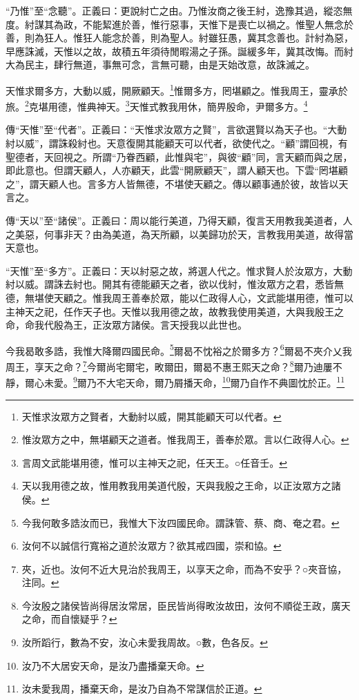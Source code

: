 {\noindent\shu{}\fzkt “乃惟”至“念聽”。正義曰：更說紂亡之由。乃惟汝商之後王紂，逸豫其過，縱恣無度。紂謀其為政，不能絜進於善，惟行惡事，天惟下是喪亡以禍之。惟聖人無念於善，則為狂人。惟狂人能念於善，則為聖人。紂雖狂愚，冀其念善也。計紂為惡，早應誅滅，天惟以之故，故積五年須待閒暇湯之子孫。誕緩多年，冀其改悔。而紂大為民主，肆行無道，事無可念，言無可聽，由是天始改意，故誅滅之。 \par}

天惟求爾多方，大動以威，開厥顧天。\footnote{天惟求汝眾方之賢者，大動紂以威，開其能顧天可以代者。}惟爾多方，罔堪顧之。惟我周王，靈承於旅。\footnote{惟汝眾方之中，無堪顧天之道者。惟我周王，善奉於眾。言以仁政得人心。}克堪用德，惟典神天。\footnote{言周文武能堪用德，惟可以主神天之祀，任天王。○任音壬。}天惟式教我用休，簡畀殷命，尹爾多方。\footnote{天以我用德之故，惟用教我用美道代殷，天與我殷之王命，以正汝眾方之諸侯。}


{\noindent\zhuan{}\fzbyks 傳“天惟”至“代者”。正義曰：“天惟求汝眾方之賢”，言欲選賢以為天子也。“大動紂以威”，謂誅殺紂也。天意復開其能顧天可以代者，欲使代之。“顧”謂回視，有聖德者，天回視之。所謂“乃眷西顧，此惟與宅”，與彼“顧”同，言天顧而與之居，即此意也。但謂天顧人，人亦顧天，此雲“開厥顧天”，謂人顧天也。下雲“罔堪顧之”，謂天顧人也。言多方人皆無德，不堪使天顧之。傳以顧事通於彼，故皆以天言之。 \par}

{\noindent\zhuan{}\fzbyks 傳“天以”至“諸侯”。正義曰：周以能行美道，乃得天顧，復言天用教我美道者，人之美惡，何事非天？由為美道，為天所顧，以美歸功於天，言教我用美道，故得當天意也。 \par}

{\noindent\shu{}\fzkt “天惟”至“多方”。正義曰：天以紂惡之故，將選人代之。惟求賢人於汝眾方，大動紂以威。謂誅去紂也。開其有德能顧天之者，欲以伐紂，惟汝眾方之君，悉皆無德，無堪使天顧之。惟我周王善奉於眾，能以仁政得人心，文武能堪用德，惟可以主神天之祀，任作天子也。天惟以我用德之故，故教我使用美道，大與我殷王之命，命我代殷為王，正汝眾方諸侯。言天授我以此世也。 \par}

今我曷敢多誥，我惟大降爾四國民命。\footnote{今我何敢多誥汝而已，我惟大下汝四國民命。謂誅管、蔡、商、奄之君。}爾曷不忱裕之於爾多方？\footnote{汝何不以誠信行寬裕之道於汝眾方？欲其戒四國，崇和協。}爾曷不夾介乂我周王，享天之命？\footnote{夾，近也。汝何不近大見治於我周王，以享天之命，而為不安乎？○夾音協，注同。}今爾尚宅爾宅，畋爾田，爾曷不惠王熙天之命？\footnote{今汝殷之諸侯皆尚得居汝常居，臣民皆尚得畋汝故田，汝何不順從王政，廣天之命，而自懷疑乎？}爾乃迪屢不靜，爾心未愛。\footnote{汝所蹈行，數為不安，汝心未愛我周故。○數，色各反。}爾乃不大宅天命，爾乃屑播天命，\footnote{汝乃不大居安天命，是汝乃盡播棄天命。}爾乃自作不典圖忱於正。\footnote{汝未愛我周，播棄天命，是汝乃自為不常謀信於正道。}


